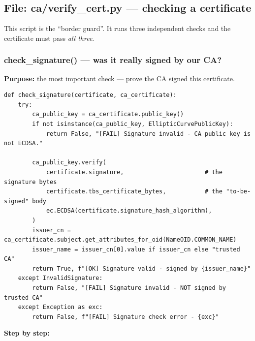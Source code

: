 \documentclass[11pt,a4paper]{article}
\begin{document}
\subsection{File: ca/verify\_cert.py --- checking a certificate}

This script is the ``border guard''. It runs three independent checks and the
certificate must pass \emph{all three}.

\subsubsection*{check\_signature() --- was it really signed by our CA?}
\textbf{Purpose:} the most important check --- prove the CA signed this certificate.
\begin{lstlisting}[style=py,caption={ca/verify\_cert.py --- verify the CA's signature on a certificate.}]
def check_signature(certificate, ca_certificate):
    try:
        ca_public_key = ca_certificate.public_key()
        if not isinstance(ca_public_key, EllipticCurvePublicKey):
            return False, "[FAIL] Signature invalid - CA public key is not ECDSA."

        ca_public_key.verify(
            certificate.signature,                       # the signature bytes
            certificate.tbs_certificate_bytes,           # the "to-be-signed" body
            ec.ECDSA(certificate.signature_hash_algorithm),
        )
        issuer_cn = ca_certificate.subject.get_attributes_for_oid(NameOID.COMMON_NAME)
        issuer_name = issuer_cn[0].value if issuer_cn else "trusted CA"
        return True, f"[OK] Signature valid - signed by {issuer_name}"
    except InvalidSignature:
        return False, "[FAIL] Signature invalid - NOT signed by trusted CA"
    except Exception as exc:
        return False, f"[FAIL] Signature check error - {exc}"
\end{lstlisting}
\textbf{Step by step:}
\end{document}
